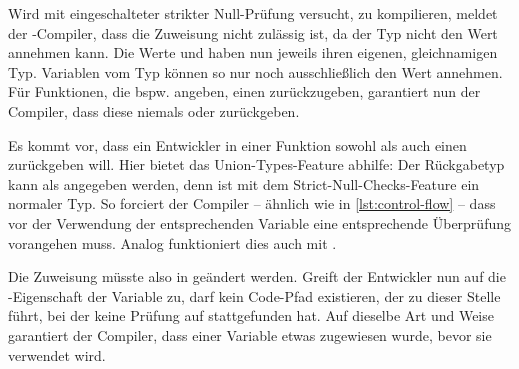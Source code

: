 \documentclass[a4paper]{scrartcl}
\begin{document}
\begin{figure}[htb]
\end{figure}

Wird mit eingeschalteter strikter Null-Prüfung versucht,  zu kompilieren, meldet der \ts-Compiler, dass die Zuweisung nicht zulässig ist, da der Typ \tsstring{} nicht den Wert \tsundefined{} annehmen kann.
Die Werte \tsnull{} und \tsundefined{} haben nun jeweils ihren eigenen, gleichnamigen Typ.
Variablen vom Typ \tsundefined{} können so nur noch ausschließlich den Wert \tsundefined{} annehmen.
Für Funktionen, die bspw. angeben, einen \tsstring{} zurückzugeben, garantiert nun der Compiler, dass diese niemals \tsnull{} oder \tsundefined{} zurückgeben.

Es kommt vor, dass ein Entwickler in einer Funktion sowohl \tsnull{} als auch einen \tsstring{} zurückgeben will.
Hier bietet das Union-Types-Feature abhilfe:
Der Rückgabetyp kann als  angegeben werden, denn \tsnull{} ist mit dem Strict-Null-Checks-Feature ein normaler Typ.
So forciert der Compiler -- ähnlich wie in \autoref{lst:control-flow} -- dass vor der Verwendung der entsprechenden Variable eine entsprechende Überprüfung vorangehen muss.
Analog funktioniert dies auch mit \tsundefined{}.

Die Zuweisung müsste also in  geändert werden.
Greift der Entwickler nun auf die -Eigenschaft der Variable  zu, darf kein Code-Pfad existieren, der zu dieser Stelle führt, bei der keine Prüfung auf \tsundefined{} stattgefunden hat.
Auf dieselbe Art und Weise garantiert der Compiler, dass einer Variable etwas zugewiesen wurde, bevor sie verwendet wird.
\end{document}
